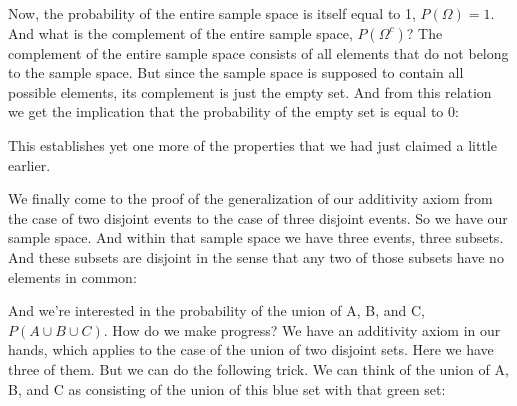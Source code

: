 \documentclass[pdftex, brazil, 12pt, twoside]{article}
\begin{document}
Now, the probability of the entire sample space is itself
equal to 1, $P(\Omega)=1$.
And what is the complement of the entire sample space, $P(\Omega^c)$?
The complement of the entire sample space consists of all
elements that do not belong to the sample space.
But since the sample space is supposed to contain all
possible elements, its complement is
just the empty set.
And from this relation we get the implication that the
probability of the empty set is equal to 0:

\begin{figure}[H]
  \begin{center}
  \end{center}
\end{figure}

This establishes yet one more of the properties that we had
just claimed a little earlier.

We finally come to the proof of the generalization of our
additivity axiom from the case of two disjoint events to the
case of three disjoint events.
So we have our sample space.
And within that sample space we have three
events, three subsets.
And these subsets are disjoint in the sense that any two of
those subsets have no elements in common:

\begin{figure}[H]
  \begin{center}
  \end{center}
\end{figure}

And we're interested in the probability of the union of A,
B, and C, $P(A \cup B \cup C)$.
How do we make progress?
We have an additivity axiom in our hands, which applies to
the case of the union of two disjoint sets.
Here we have three of them.
But we can do the following trick.
We can think of the union of A, B, and C as consisting of
the union of this blue set with that green set:
\end{document}
